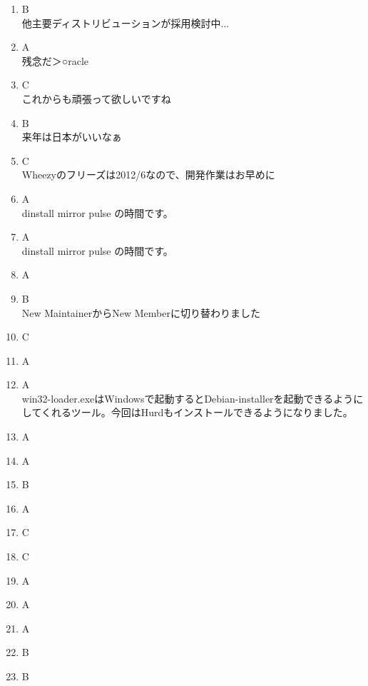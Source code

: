 \documentclass[mingoth,a4paper]{jsarticle}
\begin{document}
\begin{multicols}{2}
\begin{enumerate}
\item B\\ 他主要ディストリビューションが採用検討中...
\item A\\ 残念だ＞○racle
\item C\\ これからも頑張って欲しいですね
\item B\\ 来年は日本がいいなぁ
\item C\\ Wheezyのフリーズは2012/6なので、開発作業はお早めに
\item A\\ dinstall mirror pulse の時間です。
\item A\\ dinstall mirror pulse の時間です。
\item A\\ 
\item B\\ New MaintainerからNew Memberに切り替わりました
\item C\\ 
\item A\\
\item A\\ win32-loader.exeはWindowsで起動するとDebian-installerを起動できるようにしてくれるツール。今回はHurdもインストールできるようになりました。
\item A\\ 
\item A\\
\item B\\
\item A\\
\item C\\
\item C\\
\item A\\
\item A\\
\item A\\
\item B\\
\item B\\

\end{enumerate}
\end{multicols}
\end{document}
